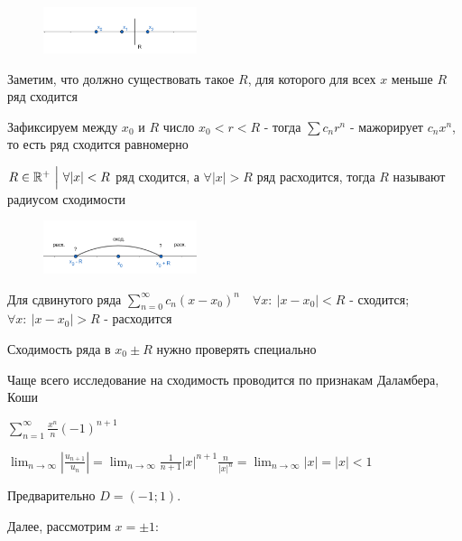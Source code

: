 \documentclass[12pt]{article}
\begin{document}
    \begin{minipage}{\textwidth}
        \begin{figure}
            \includegraphics[width=0.4\textwidth]{addchapters1/images/addchapters1_2024_10_18_1}
        \end{figure}

        \Nota Заметим, что должно существовать такое $R$, для которого для всех $x$ меньше $R$ ряд сходится

        Зафиксируем между $x_0$ и $R$ число $x_0 < r < R$ - тогда $\sum c_n r^n$ - мажорирует $c_n x^n$, то есть ряд сходится равномерно

        \Def $R \in \mathbb{R}^+ \ \Big| \ \forall |x| < R $ ряд сходится, а $\forall |x| > R$ ряд расходится, тогда $R$ называют радиусом сходимости
        
        \begin{figure}
            \includegraphics[width=0.4\textwidth]{addchapters1/images/addchapters1_2024_10_18_2}
        \end{figure}

        Для сдвинутого ряда $\sum_{n = 0}^\infty c_n (x - x_0)^n \quad \forall x: \ |x - x_0| < R$ - сходится; $\forall x: \ |x - x_0| > R$ - расходится
        
        Сходимость ряда в $x_0 \pm R$ нужно проверять специально

        \Nota Чаще всего исследование на сходимость проводится по признакам Даламбера, Коши

        \Ex $\sum_{n = 1}^\infty \frac{x^n}{n} (-1)^{n + 1}$

    \end{minipage}


    $\lim_{n \to \infty} \left|\frac{u_{n+1}}{u_n}\right| = \lim_{n \to \infty} \frac{1}{n + 1} |x|^{n + 1} \frac{n}{|x|^n} = \lim_{n \to \infty} |x| = |x| < 1$

    Предварительно $D = (-1; 1)$. 
    
    Далее, рассмотрим $x = \pm 1$: 
    
\end{document}
